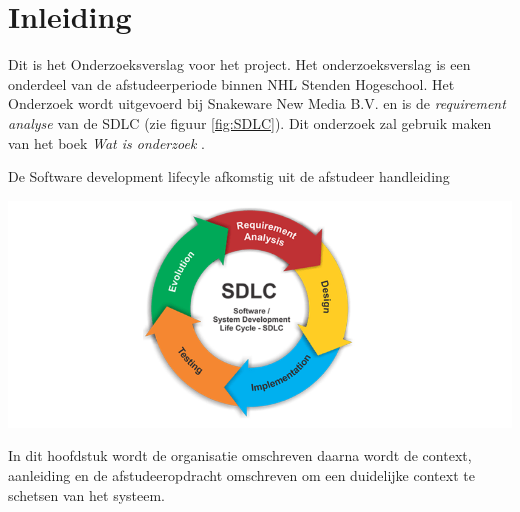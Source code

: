 \chapter{Inleiding}
Dit is het Onderzoeksverslag voor het  project.
Het onderzoeksverslag is een onderdeel van de afstudeerperiode binnen NHL Stenden Hogeschool.
Het Onderzoek wordt uitgevoerd bij Snakeware New Media B.V. en is de \textit{requirement analyse} van de \gls{SDLC} (zie figuur \ref{fig:SDLC}).
Dit onderzoek zal gebruik maken van het boek \textit{Wat is onderzoek} \Parencite{Verhoeven}.

\whitespace
\begin{graphic}
    \vspace{0.2cm}
    \captionsetup{type=figure}
    \caption{De Software development lifecyle afkomstig uit de afstudeer handleiding \Parencite{Afstudeerhandleiding}}
    \includegraphics[scale=0.5]{img/SDLC.png}
    \label{fig:SDLC}
    \vspace{0.2cm}
\end{graphic}
In dit hoofdstuk wordt de organisatie omschreven daarna wordt de context, aanleiding en de afstudeeropdracht omschreven om een duidelijke context te schetsen van het systeem.



% 

